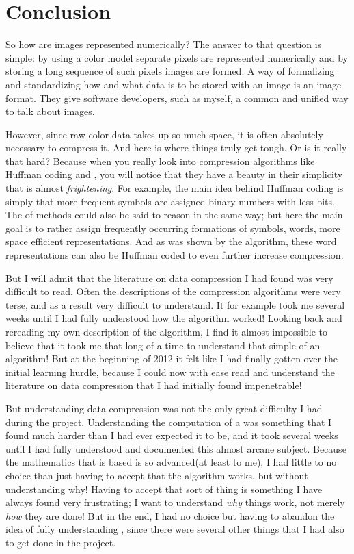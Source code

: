 \begin{comment}
  
\end{comment}

\chapter{Conclusion}
\label{cha:conclus}

So how are images represented numerically? The answer to that question
is simple: by using a color model separate pixels are represented
numerically and by storing a long sequence of such pixels images are
formed. A way of formalizing and standardizing how and what data is to
be stored with an image is an image format. They give software
developers, such as myself, a common and unified way to talk about
images.

However, since raw color data takes up so much space, it is often
absolutely necessary to compress it. And here is where things truly
get tough. Or is it really that hard? Because when you really look
into compression algorithms like Huffman coding and \lzw, you will
notice that they have a beauty in their simplicity that is almost
\textit{frightening}. For example, the main idea behind Huffman coding
is simply that more frequent symbols are assigned binary numbers with
less bits. The \lzfam of methods could also be said to reason in the
same way; but here the main goal is to rather assign frequently
occurring formations of symbols, words, more space efficient
representations. And as was shown by the  algorithm, these
word representations can also be Huffman coded to even further
increase compression.

But I will admit that the literature on data compression I had found
was very difficult to read. Often the descriptions of the compression
algorithms were very terse, and as a result very difficult to
understand. It for example took me several weeks until I had fully
understood how the \lzw algorithm worked! Looking back and rereading
my own description of the algorithm, I find it almost impossible to
believe that it took me that long of a time to understand that simple
of an algorithm! But at the beginning of 2012 it felt like I had
finally gotten over the initial learning hurdle, because I could now
with ease read and understand the literature on data compression that
I had initially found impenetrable!

But understanding data compression was not the only great difficulty I
had during the project. Understanding the computation of a \crc was
something that I found much harder than I had ever expected it to be,
and it took several weeks until I had fully understood and documented
this almost arcane subject. Because the mathematics that \crc is based
is so advanced(at least to me), I had little to no choice than just
having to accept that the algorithm works, but without understanding
why!  Having to accept that sort of thing is something I have always
found very frustrating; I want to understand \textit{why} things work,
not merely \textit{how} they are done! But in the end, I had no choice
but having to abandon the idea of fully understanding \crc, since
there were several other things that I had also to get done in the
project.

